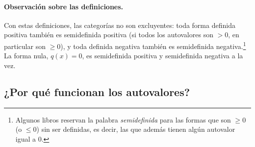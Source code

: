 \documentclass{article}
\begin{document}
\paragraph*{Observación sobre las definiciones.}
Con estas definiciones, las categorías no son excluyentes: toda forma definida positiva también es semidefinida positiva (si todos los autovalores son \(>0\), en particular son \(\ge0\)), y toda definida negativa también es semidefinida negativa.\footnote{Algunos libros reservan la palabra \emph{semidefinida} para las formas que son \(\ge0\) (o \(\le0\)) sin ser definidas, es decir, las que además tienen algún autovalor igual a \(0\).} La forma nula, \(q(x)=0\), es semidefinida positiva y semidefinida negativa a la vez.


\subsection*{¿Por qué funcionan los autovalores?}
\end{document}

